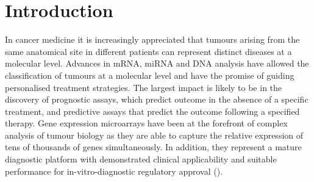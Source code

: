 \documentclass[letterpaper,12pt]{article}
\begin{document}


\section{Introduction}
In cancer medicine it is increasingly appreciated that tumours arising from the same anatomical site in different patients can represent distinct diseases at a molecular level. Advances in mRNA, miRNA and DNA analysis have allowed the classification of tumours at a molecular level and have the promise of guiding personalised treatment strategies. The largest impact is likely to be in the discovery of prognostic assays, which predict outcome in the absence of a specific treatment, and predictive assays that predict the outcome following a specified therapy. Gene expression microarrays have been at the forefront of complex analysis of tumour biology as they are able to capture the relative expression of tens of thousands of genes simultaneously. In addition, they represent a mature diagnostic platform with demonstrated clinical applicability and suitable performance for in-vitro-diagnostic regulatory approval (\citet{Veer:02,Pillai:11}).
\end{document}
